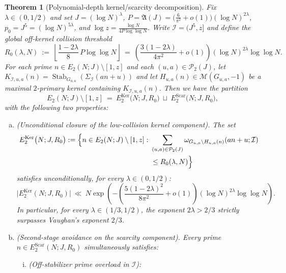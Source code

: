 \documentclass[11pt, a4paper]{article}
\theoremstyle{plain}
\newtheorem{theorem}{Theorem}[section]
\theoremstyle{definition}
\begin{document}
\begin{theorem}[Polynomial-depth kernel/scarcity decomposition]\label{thm:polynomial_depth_decomposition}
Fix $\lambda\in(0,1/2)$ and set $J=(\log N)^{\lambda}$, $P=\mathfrak{A}(J)=\big(\frac{6}{\pi^{2}}+o(1)\big)(\log N)^{2\lambda}$, $p_0=J^{5}=(\log N)^{5\lambda}$, and $\log z=\frac{\log N}{4P\log\log N}$. Write $\mathcal{I}=(J^{5},z]$ and define the global off-kernel collision threshold
\begin{equation}\label{eq:R0_threshold_def}
R_0(\lambda,N)\ :=\ \left\lfloor\frac{1-2\lambda}{8}\,P\log\log N\right\rfloor\ =\ \left(\frac{3(1-2\lambda)}{4\pi^{2}}+o(1)\right)(\log N)^{2\lambda}\log\log N.
\end{equation}
For each prime $n\in E_2(N;J)\setminus[1,z]$ and each $(u,a)\in\mathcal{P}_2(J)$, let $K_{\mathcal{I},u,a}(n)=\operatorname{Stab}_{G_{u,a}}(\Sigma_{\mathcal{I}}(an+u))$ and let $H_{u,a}(n)\in\mathcal{M}(G_{u,a},-1)$ be a maximal $2$-primary kernel containing $K_{\mathcal{I},u,a}(n)$. Then we have the partition
$$E_2(N;J)\setminus[1,z]\ =\ E_2^{\mathrm{Ker}}\big(N;J,R_0\big)\ \sqcup\ E_2^{\mathrm{Scar}}\big(N;J,R_0\big),$$
with the following two properties:
\begin{enumerate}[(a)]
    \item \emph{(Unconditional closure of the low-collision kernel component).} The set
    \[
    \begin{aligned}
    E_2^{\mathrm{Ker}}\big(N;J,R_0\big):=\Bigl\{n\in E_2(N;J)\setminus[1,z]:\ &\sum_{(u,a)\in\mathcal{P}_2(J)}\omega_{G_{u,a}\setminus H_{u,a}(n)}(an+u;\mathcal{I})\\
    &\le R_0(\lambda,N)\Bigr\}
    \end{aligned}
    \]
    satisfies unconditionally, for every $\lambda\in(0,1/2)$:
    \begin{equation}\label{eq:kernel_component_subexponential_bound}
    \big|E_2^{\mathrm{Ker}}(N;J,R_0)\big|\ \ll\ N\exp\!\left(-\left(\frac{5(1-2\lambda)^{2}}{8\pi^{2}}+o(1)\right)(\log N)^{2\lambda}\log\log N\right).
    \end{equation}
    In particular, for every $\lambda\in(1/3,1/2)$, the exponent $2\lambda>2/3$ strictly surpasses Vaughan's exponent $2/3$.
    \item \emph{(Second-stage avoidance on the scarcity component).} Every prime $n\in E_2^{\mathrm{Scar}}(N;J,R_0)$ simultaneously satisfies:
    \begin{enumerate}[(i)]
        \item \emph{(Off-stabilizer prime overload in $\mathcal{I}$):}

\end{enumerate}
\end{enumerate}
\end{theorem}
\end{document}
